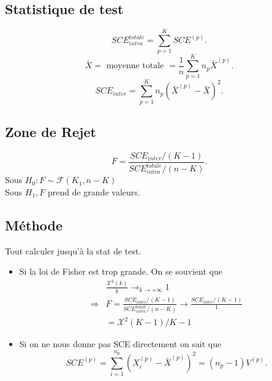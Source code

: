 \documentclass{article}
\theoremstyle{plain}%
\theoremstyle{definition}
\theoremstyle{remark}
\begin{document}
\subsection*{Statistique de test}
\[
    SCE^{totale}_{intra} = \sum_{p=1}^{K}SCE^{(p)}
.\]
\[
    \bar{X} = \text{ moyenne totale } = \frac{1}{n}\sum_{p=1}^{K} n_p \bar{X}^{(p)}
.\]
\[
    SCE_{inter} = \sum_{p=1}^{K} n_p (\bar{X}^{(p)} - \bar{X})^2
.\]
\subsection*{Zone de Rejet}
\[
    F = \frac{SCE_{inter} / (K-1)}{SCE_{intra}^{totale} / (n-K)}
.\]
Sous $ H_0 : F \sim \mathcal{F}(K_1, n-K) $ \\
Sous $ H_1, F $ prend de grande valeurs.

\subsection*{Méthode}
Tout calculer jusqu'à la stat de test. \begin{itemize}
    \item Si la loi de Fisher est trop grande. On se souvient que \begin{align*}
        &\frac{\mathcal{X}^2(k)}{k} \to _{k \to +\infty} 1 \\
        \Rightarrow & F = \frac{SCE_{inter} / (K-1)}{SCE_{intra}^{totale} / (n-K)} \to \frac{SCE_{inter} / (K-1)}{1} \\
        &= \mathcal{X}^2(K-1) / K-1
    \end{align*}
    \item Si on ne nous donne pas SCE directement on sait que
    \[
        SCE^{(p)} = \sum_{i=1}^{n_p} (X_i^{(p)} - \bar{X}^{(p)})^2 = (n_p -1) V^{(p)}
    .\]
\end{itemize}
\end{document}
